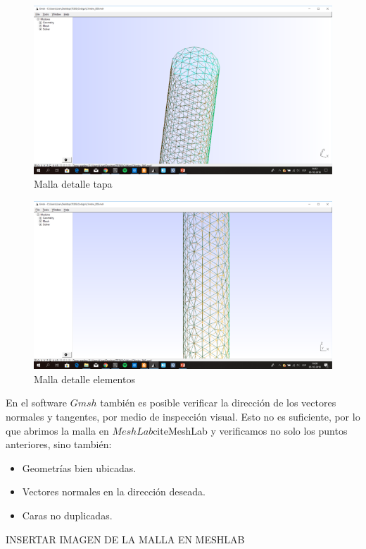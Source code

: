 \documentclass[11pt]{article}
\begin{document}
\begin{figure}[H]
\centering
\includegraphics[scale=0.8]{Imagenes/malla2.png}
\caption{Malla detalle tapa}\label{fig:malla2}
\end{figure}
\begin{figure}[H]
\centering
\includegraphics[scale=0.8]{Imagenes/malla3.png}
\caption{Malla detalle elementos}\label{fig:malla3}
\end{figure}
En el software $Gmsh$ también es posible verificar la dirección de los vectores normales y tangentes, por medio de inspección visual. Esto no es suficiente, por lo que abrimos la malla en $MeshLab$cite{MeshLab} y verificamos no solo los puntos anteriores, sino también:
\begin{itemize}
\item Geometrías bien ubicadas.
\item Vectores normales en la dirección deseada.
\item Caras no duplicadas.
\end{itemize}
INSERTAR IMAGEN DE LA MALLA EN MESHLAB
\end{document}
